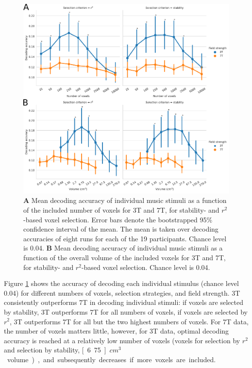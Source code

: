 \begin{figure}[!htb]
  \centering
    \includegraphics[width=\linewidth]{pics/decoding.pdf}

	\caption{\textbf{A} Mean decoding accuracy of individual music stimuli as a function of
  the included number of voxels for 3T and 7T, for stability- and
  $r^2$-based voxel selection. Error bars denote the bootstrapped 95\%
  confidence interval of the mean. The mean is taken over decoding
  accuracies of eight runs for each of the 19 participants. Chance level is
    0.04. \textbf{B} Mean
decoding accuracy of individual music stimuli as a function of the overall volume of the
included voxels for 3T and 7T, for stability- and $r^2$-based voxel
selection. Chance level is 0.04.
}
 \label{fig:decoding_accuracy_stimulus}
\end{figure}
Figure \ref{fig:decoding_accuracy_stimulus} shows the accuracy of decoding each individual stimulus (chance level 0.04) for different numbers of voxels, selection strategies, and field strength. 3T consistently outperforms 7T in decoding individual stimuli: if voxels are selected by stability, 3T outperforms 7T for all numbers of voxels, if voxels are selected by $r^{2}$, 3T outperforms 7T for all but the two highest numbers of voxels. For 7T data, the number of voxels matters little, however, for 3T data, optimal decoding accuracy is reached at a relatively low number of voxels (\unit[250]{voxels} for selection by $r^{2}$ and selection by stability, \unit[6.75]{$cm^{3}$} volume), and subsequently decreases if more voxels are included.


